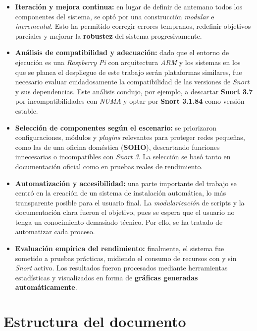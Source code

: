\documentclass[12pt,a4paper]{report}
\begin{document}
\begin{itemize}
	\item \textbf{Iteración y mejora continua:} en lugar de definir de antemano todos los componentes del sistema, se optó por una construcción \textit{modular} e \textit{incremental}. Esto ha permitido corregir errores tempranos, redefinir objetivos parciales y mejorar la \textbf{robustez} del sistema progresivamente.
	
	\item \textbf{Análisis de compatibilidad y adecuación:} dado que el entorno de ejecución es una \textit{Raspberry Pi} con arquitectura \textit{ARM} y los sistemas en los que se planea el despliegue de este trabajo serán plataformas similares, fue necesario evaluar cuidadosamente la compatibilidad de las versiones de \textit{Snort} y sus dependencias. Este análisis condujo, por ejemplo, a descartar \textbf{Snort 3.7} por incompatibilidades con \textit{NUMA} y optar por \textbf{Snort 3.1.84} como versión estable.
	
	\item \textbf{Selección de componentes según el escenario:} se priorizaron configuraciones, módulos y \textit{plugins} relevantes para proteger redes pequeñas, como las de una oficina doméstica (\textbf{SOHO}), descartando funciones innecesarias o incompatibles con \textit{Snort 3}. La selección se basó tanto en documentación oficial como en pruebas reales de rendimiento.
	
	\item \textbf{Automatización y accesibilidad:} una parte importante del trabajo se centró en la creación de un sistema de instalación automática, lo más transparente posible para el usuario final. La \textit{modularización} de scripts y la documentación clara fueron el objetivo, pues se espera que el usuario no tenga un conocimiento demasiado técnico. Por ello, se ha tratado de automatizar cada proceso.
	
	\item \textbf{Evaluación empírica del rendimiento:} finalmente, el sistema fue sometido a pruebas prácticas, midiendo el consumo de recursos con y sin \textit{Snort} activo. Los resultados fueron procesados mediante herramientas estadísticas y visualizados en forma de \textbf{gráficas generadas automáticamente}.
\end{itemize}

\pagebreak

\section*{Estructura del documento}
\end{document}
